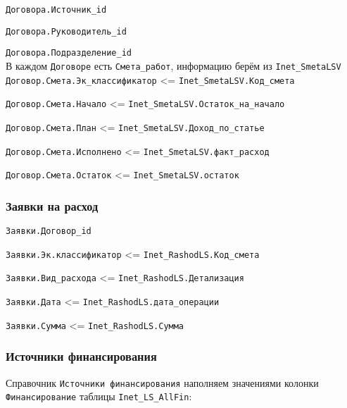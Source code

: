 \documentclass[12pt,a4paper]{scrartcl}
\begin{document}
\texttt{Договора.Источник\_id}

\texttt{Договора.Руководитель\_id}

\texttt{Договора.Подразделение\_id}\\


В каждом \texttt{Договоре} есть \texttt{Смета\_работ}, информацию берём из \texttt{Inet\_SmetaLSV}\\

\texttt{Договор.Смета.Эк\_классификатор} <= \texttt{Inet\_SmetaLSV.Код\_смета}

\texttt{Договор.Смета.Начало} <= \texttt{Inet\_SmetaLSV.Остаток\_на\_начало}

\texttt{Договор.Смета.План} <= \texttt{Inet\_SmetaLSV.Доход\_по\_статье}

\texttt{Договор.Смета.Исполнено} <= \texttt{Inet\_SmetaLSV.факт\_расход}

\texttt{Договор.Смета.Остаток} <= \texttt{Inet\_SmetaLSV.остаток}


\subsubsection*{Заявки на расход}


\texttt{Заявки.Договор\_id}

\texttt{Заявки.Эк.классификатор} <= \texttt{Inet\_RashodLS.Код\_смета}

\texttt{Заявки.Вид\_расхода} <= \texttt{Inet\_RashodLS.Детализация}

\texttt{Заявки.Дата} <= \texttt{Inet\_RashodLS.дата\_операции}

\texttt{Заявки.Сумма} <= \texttt{Inet\_RashodLS.Сумма}


\subsubsection*{Источники финансирования}

Справочник \texttt{Источники финансирования} наполняем значениями колонки \texttt{Финансирование} таблицы \texttt{Inet\_LS\_AllFin}:\\
\end{document}
